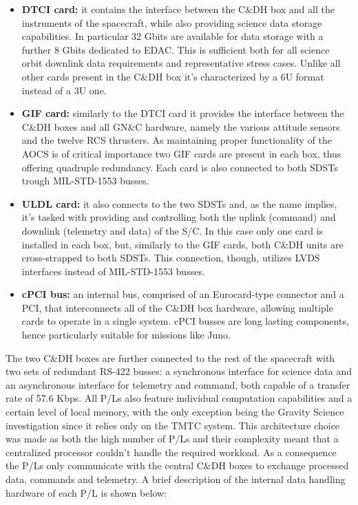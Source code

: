 \begin{itemize}
    \item \textbf{DTCI card:} it contains the interface between the C\&DH box and all the instruments of the spacecraft, while also providing science data storage capabilities. In particular 32 Gbits are available for data storage with a further 8 Gbits dedicated to EDAC. This is sufficient both for all science orbit downlink data requirements and representative stress cases. Unlike all other cards present in the C\&DH box it's characterized by a 6U format instead of a 3U one. \cite{juno_sito}
    \item \textbf{GIF card:} similarly to the DTCI card it provides the interface between the C\&DH boxes and all GN\&C hardware, namely the various attitude sensors and the twelve RCS thrusters. As maintaining proper functionality of the AOCS is of critical importance two GIF cards are present in each box, thus offering quadruple redundancy. Each card is also connected to both SDSTs trough MIL-STD-1553 \cite{MIL-STD-1553} busses. \cite{juno_telecommunication}   
    \item \textbf{ULDL card:} it also connects to the two SDSTs and, as the name implies, it's tasked with providing and controlling both the uplink (command) and downlink (telemetry and data) of the S/C. In this case only one card is installed in each box, but, similarly to the GIF cards, both C\&DH units are cross-strapped to both SDSTs. This connection, though, utilizes LVDS interfaces instead of MIL-STD-1553 busses. \cite{juno_telecommunication}  
    \item \textbf{cPCI bus:} an internal bus, comprised of an Eurocard-type connector and a PCI, that interconnects all of the C\&DH box hardware, allowing multiple cards to operate in a single system. cPCI busses are long lasting components, hence particularly suitable for missions like Juno.
    

\end{itemize}
The two C\&DH boxes are further connected to the rest of the spacecraft with two sets of redundant RS-422 busses: a synchronous interface for science data  and an asynchronous interface for telemetry and command, both capable of a transfer rate of 57.6 Kbps. \cite{UVS_info} \cite{MWR_info} 
All P/Ls also feature individual computation capabilities and a certain level of local memory, with the only exception being the Gravity Science investigation since it relies only on the TMTC system. This architecture choice was made as both the high number of P/Ls and their complexity meant that a centralized processor couldn't handle the required workload. As a consequence the P/Ls only communicate with the central C\&DH boxes to exchange processed data, commands and telemetry. A brief description of the internal data handling hardware of each P/L is shown below:
